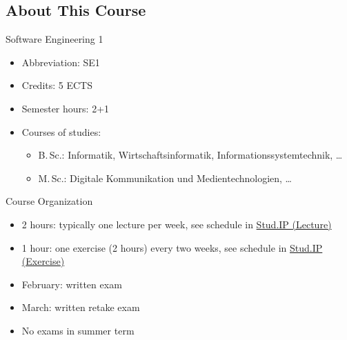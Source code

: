 \newcommand{\StudIPLectureLink}{https://studip.tu-braunschweig.de/dispatch.php/course/details?sem_id=0a1cad96cb69af389ee6df9cd7245844&again=yes}
\newcommand{\StudIPExerciseLink}{https://studip.tu-braunschweig.de/dispatch.php/course/details?sem_id=f9065bf14f1f6d8f81e1aef69c88a300&again=yes}
\newcommand{\StudIPLecture}{\href{\StudIPLectureLink}{Stud.IP (Lecture)}}
\newcommand{\StudIPExercise}{\href{\StudIPExerciseLink}{Stud.IP (Exercise)}}

\subsection{About This Course} 
\begin{frame}{\insertsubsection}
	\begin{fancycolumns}
		\begin{definition}{Software Engineering 1}
			\begin{itemize}
				\item Abbreviation: SE1
				\item Credits: 5 ECTS %
				\item Semester hours: 2+1
				\item Courses of studies:
				\begin{itemize}
					\item B.\,Sc.: Informatik, Wirtschaftsinformatik, Informationssystemtechnik, \ldots
					\item M.\,Sc.: Digitale Kommunikation und Medientechnologien, \ldots
				\end{itemize}
			\end{itemize}
		\end{definition}
		\nextcolumn
		\begin{definition}{Course Organization}
			\begin{itemize}
				\item 2 hours: typically one lecture per week, see schedule in \StudIPLecture
				\item 1 hour: one exercise (2 hours) every two weeks, see schedule in \StudIPExercise
				\item February: written exam
				\item March: written retake exam
				\item No exams in summer term
			\end{itemize}
		\end{definition}
	\end{fancycolumns}
\end{frame}

